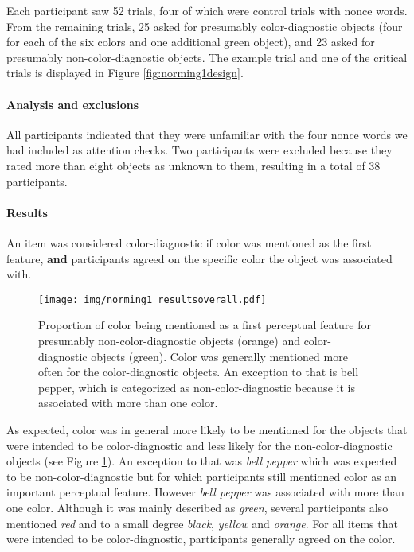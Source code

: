 \documentclass[a4paper,man,floatsintext,natbib,donotrepeattitle]{apa6}
\begin{document}
Each participant saw 52 trials, four of which were control trials with nonce words. From the remaining trials, 25 asked for presumably color-diagnostic objects (four for each of the six colors and one additional green object), and 23 asked for presumably non-color-diagnostic objects. The example trial and one of the critical trials is displayed in Figure \ref{fig:norming1design}.

\paragraph{Analysis and exclusions}
All participants indicated that they were unfamiliar with the four nonce words we had included as attention checks. Two participants were excluded because they rated more than eight objects as unknown to them, resulting in a total of 38 participants.

\paragraph{Results}
An item was considered color-diagnostic if color was mentioned as the first feature, \textbf{and} participants agreed on the specific color the object was associated with. 

\begin{figure}
	\texttt{[image: img/norming1\_resultsoverall.pdf]}
	\caption{Proportion of color being mentioned as a first perceptual feature for presumably non-color-diagnostic objects (orange) and color-diagnostic objects (green). Color was generally mentioned more often for the color-diagnostic objects. An exception to that is bell pepper, which is categorized as non-color-diagnostic because it is associated with more than one color.}
	\label{fig:norming1resultsoverall}
\end{figure}

As expected, color was in general more likely to be mentioned for the objects that were intended to be color-diagnostic and less likely for the non-color-diagnostic objects (see Figure \ref{fig:norming1resultsoverall}). An exception to that was \textit{bell pepper} which was expected to be non-color-diagnostic but for which participants still mentioned color as an important perceptual feature. However \textit{bell pepper} was associated with more than one color. Although it was mainly described as \textit{green}, several participants also mentioned \textit{red} and to a small degree \textit{black}, \textit{yellow} and \textit{orange}. 
For all items that were intended to be color-diagnostic, participants generally agreed on the color. 
\end{document}
